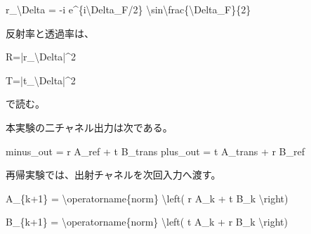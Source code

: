 \documentclass[
  xelatex,
  ja=standard]{bxjsarticle}
\newenvironment{Shaded}{}{}
\newcommand{\NormalTok}[1]{#1}
\begin{document}
\begin{Shaded}
\begin{Highlighting}[]
\NormalTok{r\_\textbackslash{}Delta}
\NormalTok{=}
\NormalTok{{-}i e\^{}\{i\textbackslash{}Delta\_F/2\}}
\NormalTok{\textbackslash{}sin\textbackslash{}frac\{\textbackslash{}Delta\_F\}\{2\}}
\end{Highlighting}
\end{Shaded}

反射率と透過率は、

\begin{Shaded}
\begin{Highlighting}[]
\NormalTok{R=|r\_\textbackslash{}Delta|\^{}2}
\end{Highlighting}
\end{Shaded}

\begin{Shaded}
\begin{Highlighting}[]
\NormalTok{T=|t\_\textbackslash{}Delta|\^{}2}
\end{Highlighting}
\end{Shaded}

で読む。

本実験の二チャネル出力は次である。

\begin{Shaded}
\begin{Highlighting}[]
\NormalTok{minus\_out = r A\_ref + t B\_trans}
\NormalTok{plus\_out  = t A\_trans + r B\_ref}
\end{Highlighting}
\end{Shaded}

再帰実験では、出射チャネルを次回入力へ渡す。

\begin{Shaded}
\begin{Highlighting}[]
\NormalTok{A\_\{k+1\}}
\NormalTok{=}
\NormalTok{\textbackslash{}operatorname\{norm\}}
\NormalTok{\textbackslash{}left(}
\NormalTok{r A\_k + t B\_k}
\NormalTok{\textbackslash{}right)}
\end{Highlighting}
\end{Shaded}

\begin{Shaded}
\begin{Highlighting}[]
\NormalTok{B\_\{k+1\}}
\NormalTok{=}
\NormalTok{\textbackslash{}operatorname\{norm\}}
\NormalTok{\textbackslash{}left(}
\NormalTok{t A\_k + r B\_k}
\NormalTok{\textbackslash{}right)}
\end{Highlighting}
\end{Shaded}
\end{document}
